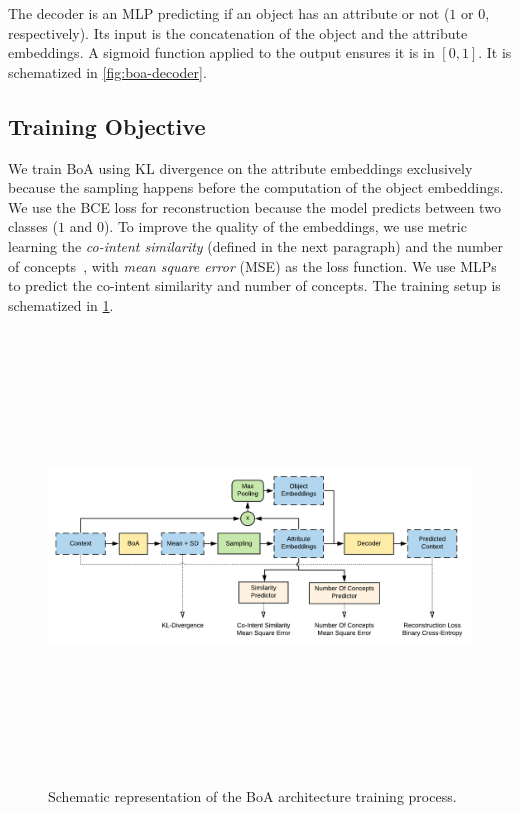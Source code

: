 The decoder is an MLP predicting if an object has an attribute or not ($1$ or $0$, respectively).
Its input is the concatenation of the object and the attribute embeddings.
A sigmoid function applied to the output ensures it is in $[0,1]$.
It is schematized in \cref{fig:boa-decoder}.


\subsection{Training Objective}\label{sec:boa-metric}
We train BoA using KL divergence on the attribute embeddings exclusively because the sampling happens before the computation of the object embeddings.
We use the BCE loss for reconstruction because the model predicts between two classes ($1$ and $0$).
To improve the quality of the embeddings, we use metric learning the \textit{co-intent similarity} (defined in the next paragraph) and the number of concepts~\cite{formal:1999:bernhard}, with \textit{mean square error} (MSE) as the loss function.
We use MLPs to predict the co-intent similarity and number of concepts.
The training setup is schematized in \cref{fig:boa-training}.

\begin{figure}
\centering
\includegraphics[height=12cm, width=\textwidth, keepaspectratio]{Figures/Ch2/training_flat.png}
\caption{Schematic representation of the BoA architecture training process.} \label{fig:boa-training}
\end{figure}

